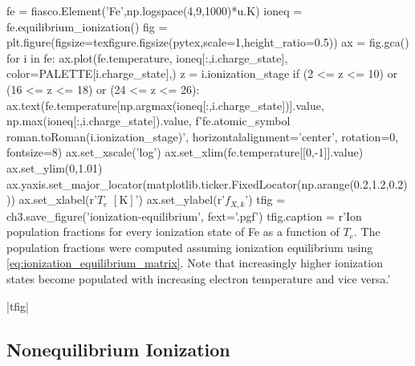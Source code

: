 \begin{pycode}[chapter3]
fe = fiasco.Element('Fe',np.logspace(4,9,1000)*u.K)
ioneq = fe.equilibrium_ionization()
fig = plt.figure(figsize=texfigure.figsize(pytex,scale=1,height_ratio=0.5))
ax = fig.gca()
for i in fe:
    ax.plot(fe.temperature, ioneq[:,i.charge_state],
            color=PALETTE[i.charge_state],)
    z = i.ionization_stage
    if (2 <= z <= 10) or (16 <= z <= 18) or (24 <= z <= 26):
        ax.text(fe.temperature[np.argmax(ioneq[:,i.charge_state])].value,
                np.max(ioneq[:,i.charge_state]).value,
                f'{fe.atomic_symbol} {roman.toRoman(i.ionization_stage)}',
                horizontalalignment='center', rotation=0,
                fontsize=8)
ax.set_xscale('log')
ax.set_xlim(fe.temperature[[0,-1]].value)
ax.set_ylim(0,1.01)
ax.yaxis.set_major_locator(matplotlib.ticker.FixedLocator(np.arange(0.2,1.2,0.2)))
ax.set_xlabel(r'$T_e$ $[\si{\kelvin}]$')
ax.set_ylabel(r'$f_{X,k}$')
tfig = ch3.save_figure('ionization-equilibrium', fext='.pgf')
tfig.caption = r'Ion population fractions for every ionization state of Fe as a function of $T_e$. The population fractions were computed assuming ionization equilibrium using \autoref{eq:ionization_equilibrium_matrix}. Note that increasingly higher ionization states become populated with increasing electron temperature and vice versa.'
\end{pycode}
\py[chapter3]|tfig|

\subsection{Nonequilibrium Ionization}\label{sec:nei}

